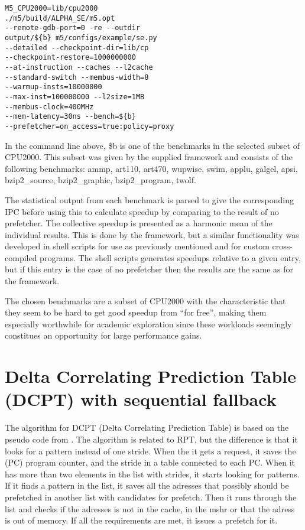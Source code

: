 \documentclass[12pt,journal,compsoc]{IEEEtran}
\begin{document}
\begin{verbatim}
M5_CPU2000=lib/cpu2000
./m5/build/ALPHA_SE/m5.opt
--remote-gdb-port=0 -re --outdir
output/${b} m5/configs/example/se.py
--detailed --checkpoint-dir=lib/cp
--checkpoint-restore=1000000000
--at-instruction --caches --l2cache
--standard-switch --membus-width=8
--warmup-insts=10000000
--max-inst=100000000 --l2size=1MB
--membus-clock=400MHz
--mem-latency=30ns --bench=${b}
--prefetcher=on_access=true:policy=proxy
\end{verbatim}

In the command line above, \${b} is one of the benchmarks in the selected
subset of CPU2000. This subset was given by the supplied framework and consists
of the following benchmarks: ammp, art110, art470, wupwise, swim, applu,
galgel, apsi, bzip2\_source, bzip2\_graphic, bzip2\_program, twolf.

The statistical output from each benchmark is parsed to give the corresponding
IPC before using this to calculate speedup by comparing to the result
of no prefetcher. The collective speedup is presented as a harmonic mean of
the individual results. This is done by the framework, but a similar
functionality was developed in shell scripts for use as previously mentioned
and for custom cross-compiled programs. The shell scripts generates
speedups relative to a given entry, but if this entry is the case of no
prefetcher then the results are the same as for the framework.

The chosen benchmarks are a subset of CPU2000 with the characteristic that
they seem to be hard to get good speedup from ``for free'', making
them especially worthwhile for academic exploration since these workloads
seemingly constitues an opportunity for large performance gains.

\section{Delta Correlating Prediction Table (DCPT) with sequential fallback}
The algorithm for DCPT (Delta Correlating Prediction Table) is based on the pseudo code from \cite{dcptpaper}.
The algorithm is related to RPT, but the difference is that it looks for a pattern instead of one stride.
When the it gets a request, it saves the (PC) program counter, and the stride in a table connected to each PC. When it has more than two elements in the list with strides, it starts looking for patterns.
If it finds a pattern in the list, it saves all the adresses that possibly should be prefetched in another list with candidates for prefetch.
Then it runs through the list and checks if the adresses is not in the cache, in the mshr or that the adress is out of memory. If all the requirements are met, it issues a prefetch for it.
\end{document}
